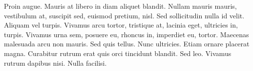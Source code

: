 Proin augue. Mauris at libero in diam aliquet blandit. Nullam mauris mauris, vestibulum at, suscipit sed, euismod pretium, nisl. Sed sollicitudin nulla id velit. Aliquam vel turpis. Vivamus arcu tortor, tristique at, lacinia eget, ultricies in, turpis. Vivamus urna sem, posuere eu, rhoncus in, imperdiet eu, tortor. Maecenas malesuada arcu non mauris. Sed quis tellus. Nunc ultricies. Etiam ornare placerat magna. Curabitur rutrum erat quis orci tincidunt blandit. Sed leo. Vivamus rutrum dapibus nisi. Nulla facilisi. 
